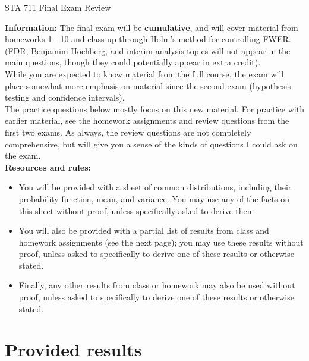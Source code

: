 \documentclass[11pt]{article}
\begin{document}
\begin{center}
\Large
STA 711 Final Exam Review\\
\normalsize
\vspace{5mm}
\end{center} 

\noindent \textbf{Information:} The final exam will be \textbf{cumulative}, and will cover material from homeworks 1 - 10 and class up through Holm's method for controlling FWER. (FDR, Benjamini-Hochberg, and interim analysis topics will not appear in the main questions, though they could potentially appear in extra credit).\\

\noindent While you are expected to know material from the full course, the exam will place somewhat more emphasis on material since the second exam (hypothesis testing and confidence intervals).\\

\noindent The practice questions below mostly focus on this new material. For practice with earlier material, see the homework assignments and review questions from the first two exams. As always, the review questions are not completely comprehensive, but will give you a sense of the kinds of questions I could ask on the exam.\\

\noindent \textbf{Resources and rules:} 

\begin{itemize}
\item You will be provided with a sheet of common distributions, including their probability function, mean, and variance. You may use any of the facts on this sheet without proof, unless specifically asked to derive them

\item You will also be provided with a partial list of results from class and homework assignments (see the next page); you may use these results without proof, unless asked to specifically to derive one of these results or otherwise stated.

\item Finally, any other results from class or homework may also be used without proof, unless asked to specifically to derive one of these results or otherwise stated.
\end{itemize}

\newpage

\section*{Provided results}
\end{document}
